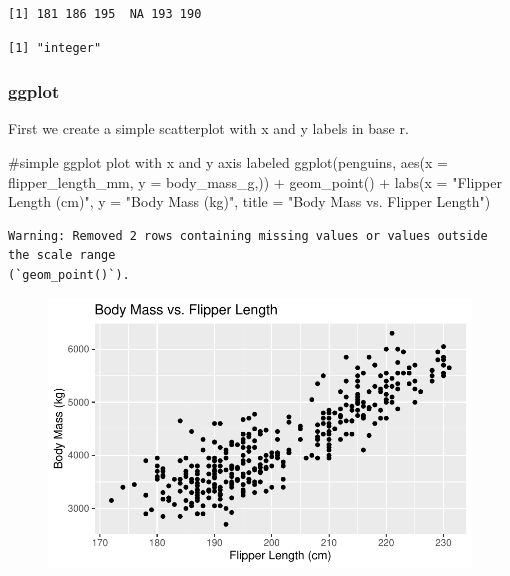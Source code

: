 \documentclass[
  letterpaper,
  DIV=11,
  numbers=noendperiod]{scrreprt}
\newenvironment{Shaded}{\begin{snugshade}}{\end{snugshade}}
\newcommand{\AttributeTok}[1]{\textcolor[rgb]{0.40,0.45,0.13}{#1}}
\newcommand{\CommentTok}[1]{\textcolor[rgb]{0.37,0.37,0.37}{#1}}
\newcommand{\FunctionTok}[1]{\textcolor[rgb]{0.28,0.35,0.67}{#1}}
\newcommand{\NormalTok}[1]{\textcolor[rgb]{0.00,0.23,0.31}{#1}}
\newcommand{\SpecialCharTok}[1]{\textcolor[rgb]{0.37,0.37,0.37}{#1}}
\newcommand{\StringTok}[1]{\textcolor[rgb]{0.13,0.47,0.30}{#1}}
\begin{document}
\begin{verbatim}
[1] 181 186 195  NA 193 190
\end{verbatim}

\begin{Shaded}
\end{Shaded}

\begin{verbatim}
[1] "integer"
\end{verbatim}

\hypertarget{ggplot-3}{%
\subsubsection{ggplot}\label{ggplot-3}}

First we create a simple scatterplot with x and y labels in base r.

\begin{Shaded}
\begin{Highlighting}[]
\CommentTok{\#simple ggplot plot with x and y axis labeled}
\FunctionTok{ggplot}\NormalTok{(penguins, }\FunctionTok{aes}\NormalTok{(}\AttributeTok{x =}\NormalTok{ flipper\_length\_mm, }\AttributeTok{y =}\NormalTok{ body\_mass\_g,)) }\SpecialCharTok{+}
  \FunctionTok{geom\_point}\NormalTok{() }\SpecialCharTok{+}
  \FunctionTok{labs}\NormalTok{(}\AttributeTok{x =} \StringTok{"Flipper Length (cm)"}\NormalTok{, }\AttributeTok{y =} \StringTok{"Body Mass (kg)"}\NormalTok{,}
       \AttributeTok{title =} \StringTok{"Body Mass vs. Flipper Length"}\NormalTok{)}
\end{Highlighting}
\end{Shaded}

\begin{verbatim}
Warning: Removed 2 rows containing missing values or values outside the scale range
(`geom_point()`).
\end{verbatim}

\begin{figure}[H]

{\centering \includegraphics{scripts/02_dataViz/class4_files/figure-pdf/numvsnum2_ggplot-1.pdf}

}

\end{figure}
\end{document}
